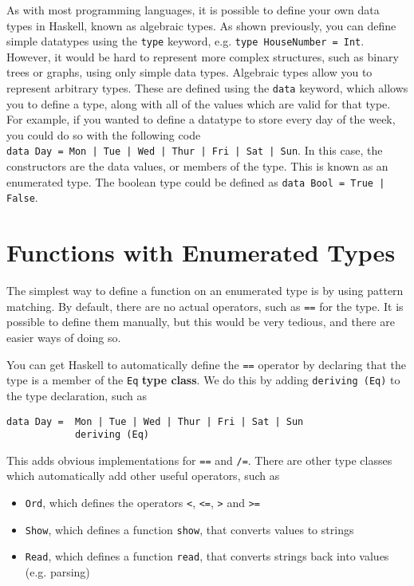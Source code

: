 
As with most programming languages, it is possible to define your own data types in Haskell, known as algebraic types.
 As shown previously, you can define simple datatypes using the \verb`type` keyword, e.g. \verb`type HouseNumber = Int`.
 However, it would be hard to represent more complex structures, such as binary trees or graphs, using only simple data
 types. Algebraic types allow you to represent arbitrary types. These are defined using the \verb`data` keyword, which
 allows you to define a type, along with all of the values which are valid for that type. For example, if you wanted to
 define a datatype to store every day of the week, you could do so with the following code\\
 \verb `data Day = Mon | Tue | Wed | Thur | Fri | Sat | Sun`. In this case, the constructors are the data values, or
 members of the type. This is known as an enumerated type. The boolean type could be defined as
 \verb`data Bool = True | False`.

\section*{Functions with Enumerated Types}

The simplest way to define a function on an enumerated type is by using pattern matching. By default, there are no
 actual operators, such as \verb`==` for the type. It is possible to define them manually, but this would be very
 tedious, and there are easier ways of doing so.

You can get Haskell to automatically define the \verb`==` operator by declaring that the type is a member of the
 \verb`Eq` \textbf{type class}. We do this by adding \verb`deriving (Eq)` to the type declaration, such as
\begin{verbatim}
data Day =  Mon | Tue | Wed | Thur | Fri | Sat | Sun
            deriving (Eq)
\end{verbatim}
This adds obvious implementations for \verb`==` and \verb`/=`. There are other type classes which automatically add
 other useful operators, such as
\begin{itemize}
  \item \verb`Ord`, which defines the operators \verb`<`, \verb`<=`, \verb`>` and \verb`>=`
  \item \verb`Show`, which defines a function \verb`show`, that converts values to strings
  \item \verb`Read`, which defines a function \verb`read`, that converts strings back into values (e.g. parsing)
\end{itemize}

